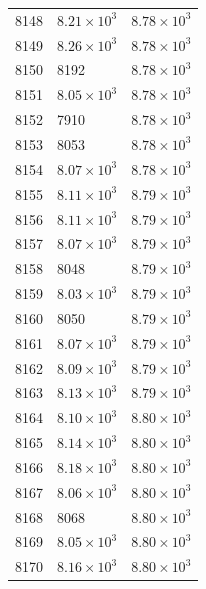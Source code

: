 \begin{table}[H]
\begin{tabular}{lll}
8148 & $\displaystyle 8.21 \times 10^{3}$ & $\displaystyle 8.78 \times 10^{3}$ \\
8149 & $\displaystyle 8.26 \times 10^{3}$ & $\displaystyle 8.78 \times 10^{3}$ \\
8150 & 8192 & $\displaystyle 8.78 \times 10^{3}$ \\
8151 & $\displaystyle 8.05 \times 10^{3}$ & $\displaystyle 8.78 \times 10^{3}$ \\
8152 & 7910 & $\displaystyle 8.78 \times 10^{3}$ \\
8153 & 8053 & $\displaystyle 8.78 \times 10^{3}$ \\
8154 & $\displaystyle 8.07 \times 10^{3}$ & $\displaystyle 8.78 \times 10^{3}$ \\
8155 & $\displaystyle 8.11 \times 10^{3}$ & $\displaystyle 8.79 \times 10^{3}$ \\
8156 & $\displaystyle 8.11 \times 10^{3}$ & $\displaystyle 8.79 \times 10^{3}$ \\
8157 & $\displaystyle 8.07 \times 10^{3}$ & $\displaystyle 8.79 \times 10^{3}$ \\
8158 & 8048 & $\displaystyle 8.79 \times 10^{3}$ \\
8159 & $\displaystyle 8.03 \times 10^{3}$ & $\displaystyle 8.79 \times 10^{3}$ \\
8160 & 8050 & $\displaystyle 8.79 \times 10^{3}$ \\
8161 & $\displaystyle 8.07 \times 10^{3}$ & $\displaystyle 8.79 \times 10^{3}$ \\
8162 & $\displaystyle 8.09 \times 10^{3}$ & $\displaystyle 8.79 \times 10^{3}$ \\
8163 & $\displaystyle 8.13 \times 10^{3}$ & $\displaystyle 8.79 \times 10^{3}$ \\
8164 & $\displaystyle 8.10 \times 10^{3}$ & $\displaystyle 8.80 \times 10^{3}$ \\
8165 & $\displaystyle 8.14 \times 10^{3}$ & $\displaystyle 8.80 \times 10^{3}$ \\
8166 & $\displaystyle 8.18 \times 10^{3}$ & $\displaystyle 8.80 \times 10^{3}$ \\
8167 & $\displaystyle 8.06 \times 10^{3}$ & $\displaystyle 8.80 \times 10^{3}$ \\
8168 & 8068 & $\displaystyle 8.80 \times 10^{3}$ \\
8169 & $\displaystyle 8.05 \times 10^{3}$ & $\displaystyle 8.80 \times 10^{3}$ \\
8170 & $\displaystyle 8.16 \times 10^{3}$ & $\displaystyle 8.80 \times 10^{3}$ \\

\end{tabular}
\end{table}
